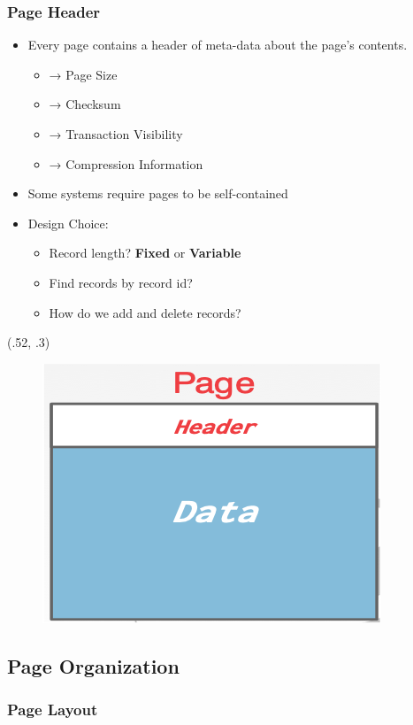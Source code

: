 \begin{frame}[fragile]
	\frametitle{Page Header}
	\begin{itemize}
		\item Every page contains a header of meta-data about the page's contents.
		\begin{itemize}
			\item → Page Size
			\item → Checksum
			\item → Transaction Visibility
			\item → Compression Information
		\end{itemize}
		\item Some systems require pages to be self-contained
		\item Design Choice:
		\begin{itemize}
			\item Record length? \textbf{Fixed} or \textbf{Variable}
			\item Find records by record id?
			\item How do we add and delete records?
		\end{itemize}
	\end{itemize}
	\begin{textblock*}{.45\paperwidth}(.52\paperwidth, .3\paperheight) %
		\begin{figure}
			\includegraphics[width=.4\linewidth]{figs/dbfile-pageheader.png}
		\end{figure}
	\end{textblock*}
\end{frame}

\subsection{Page Organization}

\subsubsection{Page Layout}

